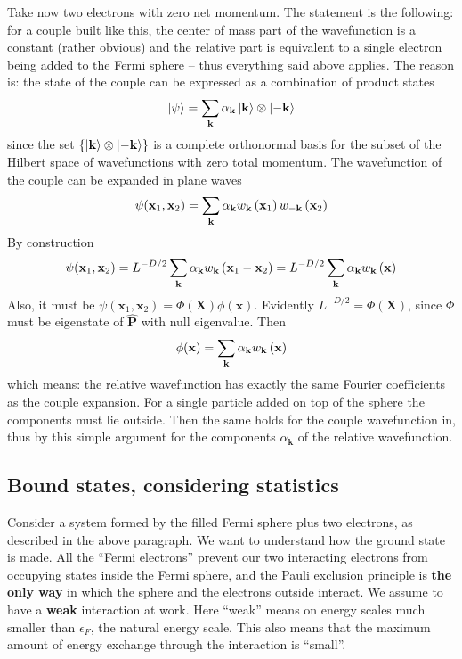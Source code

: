 Take now two electrons with zero net momentum. The statement is the following: for a couple built like this, the center of mass part of the wavefunction is a constant (rather obvious) and the relative part is equivalent to a single electron being added to the Fermi sphere -- thus everything said above applies. The reason is: the state of the couple can be expressed as a combination of product states
\[
	\ket{\psi} = \sum_\mathbf{k} \alpha_\mathbf{k} \ket{\mathbf{k}} \otimes \ket{-\mathbf{k}}
\]
since the set $\lbrace \ket{\mathbf{k}} \otimes \ket{-\mathbf{k}} \rbrace$ is a complete orthonormal basis for the subset of the Hilbert space of wavefunctions with zero total momentum. 
The wavefunction of the couple can be expanded in plane waves
\[
	\psi(\mathbf{x}_1,\mathbf{x}_2) = \sum_\mathbf{k} \alpha_\mathbf{k} w_\mathbf{k} \left({\mathbf{x}_1}\right) w_{-\mathbf{k}} \left({\mathbf{x}_2}\right)
\]
By construction
\[
	\psi(\mathbf{x}_1,\mathbf{x}_2) = L^{-D/2} \sum_\mathbf{k} \alpha_\mathbf{k} w_\mathbf{k} \left({\mathbf{x}_1-\mathbf{x}_2}\right) = L^{-D/2} \sum_\mathbf{k} \alpha_\mathbf{k} w_\mathbf{k} \left({\mathbf{x}}\right)
\]
Also, it must be $\psi(\mathbf{x}_1,\mathbf{x}_2) = \Phi(\mathbf{X}) \phi(\mathbf{x})$. Evidently $L^{-D/2} = \Phi(\mathbf{X})$, since $\Phi$ must be eigenstate of $\hat{\mathbf{P}}$ with null eigenvalue. Then
\[
	\phi(\mathbf{x}) = \sum_\mathbf{k} \alpha_\mathbf{k} w_\mathbf{k} \left({\mathbf{x}}\right)
\]
which means: the relative wavefunction has exactly the same Fourier coefficients as the couple expansion. For a single particle added on top of the sphere the components must lie outside. Then the same holds for the couple wavefunction in, thus by this simple argument for the components $\alpha_\mathbf{k}$ of the relative wavefunction.

\subsection{Bound states, considering statistics}\label{subsec:bound states, considering statistics}

Consider a system formed by the filled Fermi sphere plus two electrons, as described in the above paragraph. We want to understand how the ground state is made. All the ``Fermi electrons'' prevent our two interacting electrons from occupying states inside the Fermi sphere, and the Pauli exclusion principle is \textbf{the only way} in which the sphere and the electrons outside interact. We assume to have a \textbf{weak} interaction at work. Here ``weak'' means on energy scales much smaller than $\epsilon_F$, the natural energy scale. This also means that the maximum amount of energy exchange through the interaction is ``small''.

